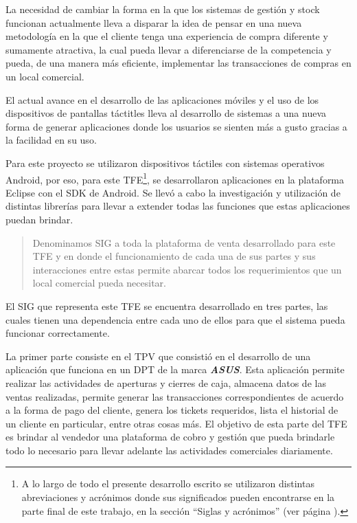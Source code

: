 
La necesidad de cambiar la forma en la que los sistemas de gesti\'on y stock funcionan actualmente lleva a disparar la idea de pensar en una nueva metodolog\'ia en la que el cliente tenga una experiencia de compra diferente y sumamente atractiva, la cual pueda llevar a diferenciarse de la competencia y pueda, de una manera m\'as eficiente, implementar las transacciones de compras en un local comercial.

El actual avance en el desarrollo de las aplicaciones m\'oviles y el uso de los dispositivos de pantallas t\'actitles lleva al desarrollo de sistemas a una nueva forma de generar aplicaciones  donde los usuarios se sienten m\'as a gusto gracias a la facilidad en su uso.

Para este proyecto se utilizaron dispositivos t\'actiles con sistemas operativos Android\Si{\texttrademark}, por eso, para este \ac{TFE}\footnote{A lo largo de todo el presente desarrollo escrito se utilizaron distintas abreviaciones y acr\'onimos donde sus significados pueden encontrarse en la parte final de este trabajo, en la secci\'on ``Siglas y acr\'onimos'' (ver p\'agina \pageref{sec:acronimos}).}, se desarrollaron aplicaciones en la plataforma Eclipse\Si{\texttrademark} con el \ac{SDK} de Android\Si{\texttrademark}. Se llev\'o a cabo la investigaci\'on y utilizaci\'on de distintas librer\'ias para llevar a extender todas las funciones que estas aplicaciones puedan brindar.

\begin{quote}
Denominamos \ac{SIG} a toda la plataforma de venta desarrollado para este \ac{TFE} y en donde el funcionamiento de cada una de sus partes y sus interacciones entre estas permite abarcar todos los requerimientos que un local comercial pueda necesitar.
\end{quote}

El \ac{SIG} que representa este \ac{TFE} se encuentra desarrollado en tres partes, las cuales tienen una dependencia entre cada uno de ellos para que el sistema pueda funcionar correctamente.

La primer parte consiste en el \ac{TPV} que consisti\'o en el desarrollo de una aplicaci\'on que funciona en un \ac{DPT} de la marca \textbf{\textit{ASUS}}. Esta aplicaci\'on permite realizar las actividades de aperturas y cierres de caja, almacena datos de las ventas realizadas, permite generar las transacciones correspondientes de acuerdo a la forma de pago del cliente, genera los tickets requeridos, lista el historial de un cliente en particular, entre otras cosas m\'as. El objetivo de esta parte del \ac{TFE} es brindar al vendedor una plataforma de cobro y gesti\'on que pueda brindarle todo lo necesario para llevar adelante las actividades comerciales diariamente.

